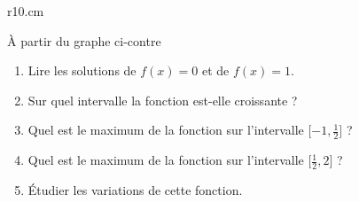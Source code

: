
\begin{exercice}\label{exoSeconde-0047}

\begin{wrapfigure}{r}{10.cm}
   \vspace{-0.5cm}        %
   \centering
   
\end{wrapfigure}

    À partir du graphe ci-contre
    \begin{enumerate}
        \item
            Lire les solutions de \( f(x)=0\) et de  \( f(x)=1\).
        \item
            Sur quel intervalle la fonction est-elle croissante ?
        \item 
            Quel est le maximum de la fonction sur l'intervalle \( \mathopen[ -1 , \frac{ 1 }{2} \mathclose]\) ?
        \item 
            Quel est le maximum de la fonction sur l'intervalle \( \mathopen[ \frac{ 1 }{2} , 2 \mathclose]\) ?
        \item
            Étudier les variations de cette fonction. 
    \end{enumerate}

\end{exercice}

